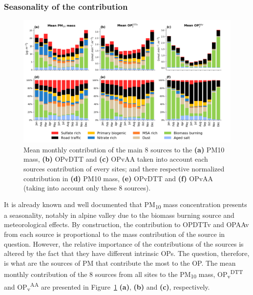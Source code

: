 \documentclass[acp]{copernicus}
\begin{document}
\subsubsection{Seasonality of the contribution}%
\label{seasonality-of-the-contribution}

\begin{figure}[ht]
    \centering
    \includegraphics[width=1.0\linewidth]{figures/fig6.png}
    \caption{
    Mean monthly contribution of the main 8 sources to the \textbf{(a)} PM10 mass, \textbf{(b)}
    OPvDTT and \textbf{(c)} OPvAA taken into account each sources contribution of every
    sites; and there respective normalized contribution in \textbf{(d)} PM10 mass, \textbf{(e)}
    OPvDTT and \textbf{(f)} OPvAA (taking into account only these 8 sources). 
    }%
    \label{fig:fig6}
\end{figure}

It is already known and well documented that PM\textsubscript{10} mass
concentration presents a seasonality, notably in alpine valley due to
the biomass burning source and meteorological effects. By construction,
the contribution to OPDTTv and OPAAv from each source is proportional to
the mass contribution of the source in question. However, the relative
importance of the contributions of the sources is altered by the fact
that they have different intrinsic OPs. The question, therefore, is what
are the sources of PM that contribute the most to the OP. The mean
monthly contribution of the 8 sources from all sites to the
PM\textsubscript{10} mass, OP\textsubscript{v}\textsuperscript{DTT} and
OP\textsubscript{v}\textsuperscript{AA} are presented in
Figure~\ref{fig:fig6} \textbf{(a)},
\textbf{(b)} and \textbf{(c)}, respectively.
\end{document}
